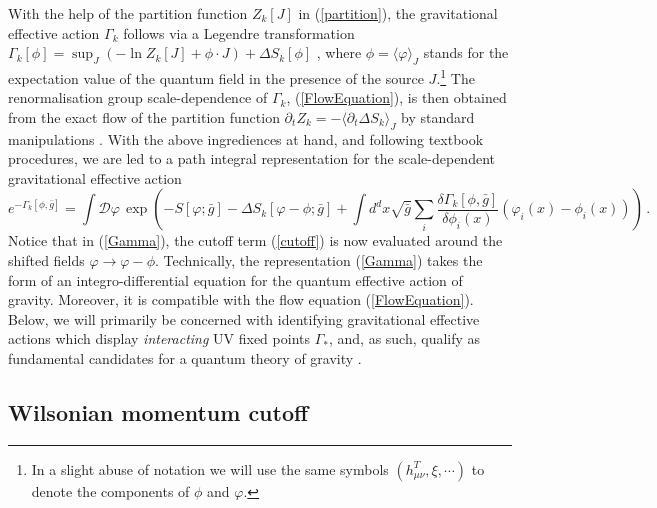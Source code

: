 \documentclass[notitlepage,eqsecnum,bm,amsmath,preprintnumbers,superscriptaddress,nofootinbib,aps,11pt]{revtex4-1}
\def\eq#1{(\ref{#1})}
\def\beq{\begin{equation}}
\def\eeq{\end{equation}}
\begin{document}
With the help of the partition function $Z_k[J]$ in \eq{partition}, the gravitational effective action $\Gamma_k$ follows via a Legendre transformation $\Gamma_k[\phi]=\sup_J(-\ln Z_k[J]+\phi \cdot J) +\Delta S_k[\phi]$ \cite{Litim:1998nf,Litim:2011cp}, where $\phi=\langle\varphi\rangle_J$ stands for the expectation value of the quantum field in the presence of the source $J$.\footnote{In a slight abuse of notation we will use the same symbols $(h_{\mu\nu}^T , \xi,\cdots)$  to denote the components of $\phi$ and $\varphi$.} The renormalisation group scale-dependence of $\Gamma_k$,  \eq{FlowEquation}, is then obtained  from the exact  flow of the partition function $\partial_t Z_k=-\langle \partial_t \Delta S_k\rangle_J$  by standard manipulations \cite{Wetterich:1992yh,Morris:1993qb,Reuter:1996cp}.
With the above ingrediences at hand, and following textbook procedures, we are led to a path integral representation for the scale-dependent gravitational effective action 
\beq\label{Gamma}
e^{-\Gamma_k[\phi,\bar{g}]} = \int \mathcal{D} \varphi \, 
\exp\left(
{-S[\varphi;\bar{g}]   - \Delta S_k[\varphi- \phi;\bar{g}]    + \int d^dx \sqrt{\bar g}\sum_i \frac{\delta \Gamma_k[\phi, \bar{g}]}{ \delta \phi_i(x)}  (\varphi_i(x) - \phi_i(x)) }
\right)\,.
\eeq
Notice  that in \eq{Gamma}, the cutoff term \eq{cutoff} is now evaluated around the shifted fields $\varphi\to \varphi-\phi$. Technically, the representation \eq{Gamma}  takes the form of an integro-differential equation for the quantum effective action of gravity. Moreover, it is compatible with the flow equation \eq{FlowEquation}. 
Below, we will primarily be concerned with identifying  gravitational effective actions which display   {\it interacting} UV fixed points $\Gamma_*$, and, as such, qualify as fundamental candidates for a quantum theory of gravity  \cite{Litim:2011cp}.


\subsection{Wilsonian momentum cutoff}
\label{subsec:RegulatorSchemes}
\end{document}
